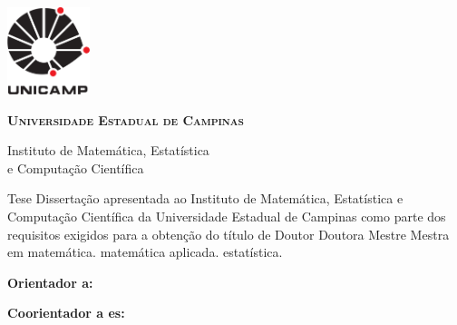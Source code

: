 \thispagestyle{plain}
\includegraphics[width=.94in, height=1in,keepaspectratio=true]{figuras/unicamp-logo}
\begin{center}
  {\large\textbf{\textsc{Universidade Estadual de Campinas}}
  \vspace{.5cm}

  Instituto de Matemática, Estatística \\
  e Computação Científica}
\end{center}
\vfill
\begin{center}
  {\large\textbf{\textsc{\autor}}}
\end{center}
\vfill
\begin{center}
  {\Large\textbf{\textsc{\titulo}}}
\end{center}
\vfill

\begin{flushright}
  \begin{minipage}[c]{.5\textwidth}
    \ifx\mestrado\undefined
    Tese
    \else
    Dissertação
    \fi
    apresentada ao Instituto de Matemática,
    Estatística e Computação Científica da Universidade
    Estadual de Campinas como parte dos requisitos exigidos
    para a obtenção do título de
    \ifx\mestrado\undefined
    \ifx\femaleAuthor\undefined
    Doutor
    \else
    Doutora
    \fi
    \else
    \ifx\femaleAuthor\undefined
    Mestre
    \else
    Mestra
    \fi
    \fi
    em
    \ifx\matematica\undefined
    \else
    matemática.
    \fi
    \ifx\aplicada\undefined
    \else
    matemática aplicada.
    \fi
    \ifx\estatistica\undefined
    \else
    estatística.
    \fi
  \end{minipage}
\end{flushright}
\vspace{.5cm}

\noindent
\textbf{Orientador\ifx\femaleOrientador\undefined
\else
a\fi: \orientador
}
\vspace{.25cm}

\ifx\coorientador\undefined
\else
\noindent
\textbf{Coorientador\ifx\femaleCoorientador\undefined
\else
a\fi\ifx\Coorientadores\undefined
\else
es\fi: \coorientador
}
\vspace{.5cm}
\fi

